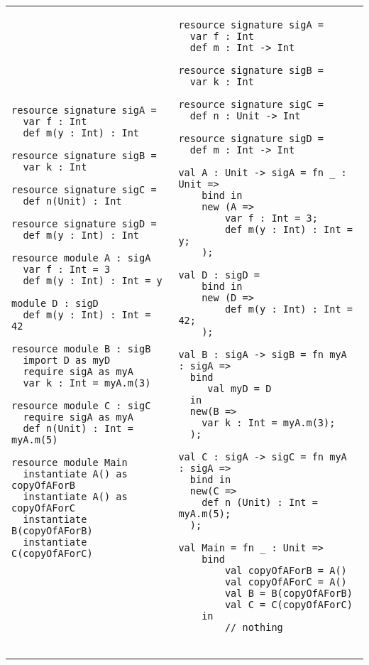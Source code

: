 \documentclass{llncs}
\begin{document}
\begin{tabular}{p{}p{}}
\begin{minipage}[t]{\textwidth}
\begin{lstlisting}
resource signature sigA =
  var f : Int
  def m(y : Int) : Int

resource signature sigB =
  var k : Int

resource signature sigC =
  def n(Unit) : Int

resource signature sigD =
  def m(y : Int) : Int

resource module A : sigA
  var f : Int = 3
  def m(y : Int) : Int = y

module D : sigD
  def m(y : Int) : Int = 42

resource module B : sigB
  import D as myD
  require sigA as myA
  var k : Int = myA.m(3)

resource module C : sigC
  require sigA as myA
  def n(Unit) : Int = myA.m(5)

resource module Main
  instantiate A() as copyOfAForB 
  instantiate A() as copyOfAForC 
  instantiate B(copyOfAForB)
  instantiate C(copyOfAForC)

\end{lstlisting}
\end{minipage}
&
\hspace{-10ex}
\begin{minipage}[t]{\textwidth}
\begin{lstlisting}
resource signature sigA =
  var f : Int
  def m : Int -> Int

resource signature sigB =
  var k : Int

resource signature sigC =
  def n : Unit -> Int

resource signature sigD =
  def m : Int -> Int
  
val A : Unit -> sigA = fn _ : Unit =>
    bind in
    new (A =>
        var f : Int = 3;
        def m(y : Int) : Int = y;
    );
    
val D : sigD =
    bind in
    new (D =>
        def m(y : Int) : Int = 42;
    );

val B : sigA -> sigB = fn myA : sigA =>
  bind
     val myD = D
  in
  new(B =>
    var k : Int = myA.m(3);
  );

val C : sigA -> sigC = fn myA : sigA =>
  bind in
  new(C =>
    def n (Unit) : Int = myA.m(5);
  );

val Main = fn _ : Unit =>
    bind
        val copyOfAForB = A()
        val copyOfAForC = A()
        val B = B(copyOfAForB)
        val C = C(copyOfAForC)
    in
        // nothing
        
\end{lstlisting}
\end{minipage}
\end{tabular}
\end{document}
